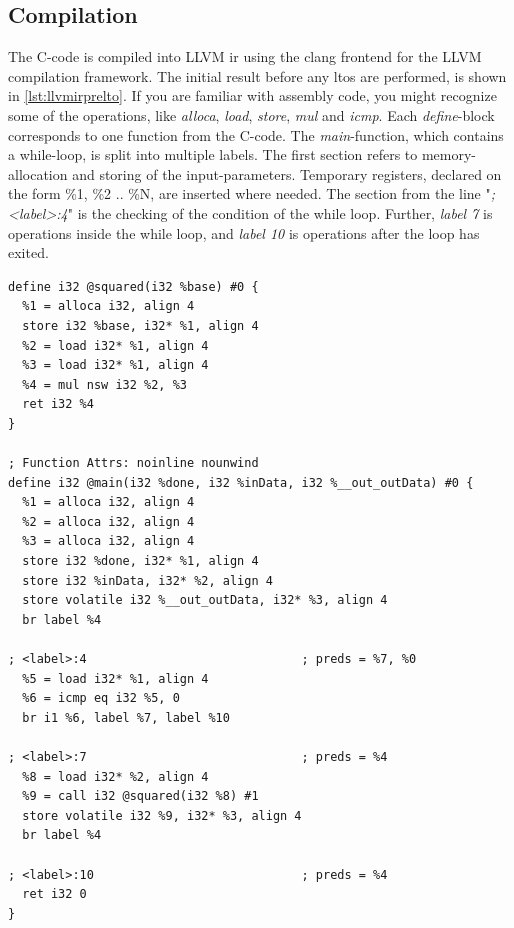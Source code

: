\subsection{Compilation}
The C-code is compiled into LLVM \gls{ir} using the clang frontend for the LLVM compilation framework. The initial result before any \gls{lto}s are performed, is shown in \cref{lst:llvmirprelto}. If you are familiar with assembly code, you might recognize some of the operations, like \textit{alloca}, \textit{load}, \textit{store}, \textit{mul} and \textit{icmp}. Each \textit{define}-block corresponds to one function from the C-code. The \textit{main}-function, which contains a while-loop, is split into multiple labels. The first section refers to memory-allocation and storing of the input-parameters. Temporary registers, declared on the form \%1, \%2 .. \%N, are inserted where needed. The section from the line "\textit{; <label>:4}" is the checking of the condition of the while loop. Further, \textit{label 7} is operations inside the while loop, and \textit{label 10} is operations after the loop has exited.
\lstset{language=llvm,style=LLVMstyle}
\begin{lstlisting}[caption={LLVM IR before LTO},label=lst:llvmirprelto]
define i32 @squared(i32 %base) #0 {
  %1 = alloca i32, align 4
  store i32 %base, i32* %1, align 4
  %2 = load i32* %1, align 4
  %3 = load i32* %1, align 4
  %4 = mul nsw i32 %2, %3
  ret i32 %4
}

; Function Attrs: noinline nounwind
define i32 @main(i32 %done, i32 %inData, i32 %__out_outData) #0 {
  %1 = alloca i32, align 4
  %2 = alloca i32, align 4
  %3 = alloca i32, align 4
  store i32 %done, i32* %1, align 4
  store i32 %inData, i32* %2, align 4
  store volatile i32 %__out_outData, i32* %3, align 4
  br label %4

; <label>:4                              ; preds = %7, %0
  %5 = load i32* %1, align 4
  %6 = icmp eq i32 %5, 0
  br i1 %6, label %7, label %10

; <label>:7                              ; preds = %4
  %8 = load i32* %2, align 4
  %9 = call i32 @squared(i32 %8) #1
  store volatile i32 %9, i32* %3, align 4
  br label %4

; <label>:10                             ; preds = %4
  ret i32 0
}
\end{lstlisting}
